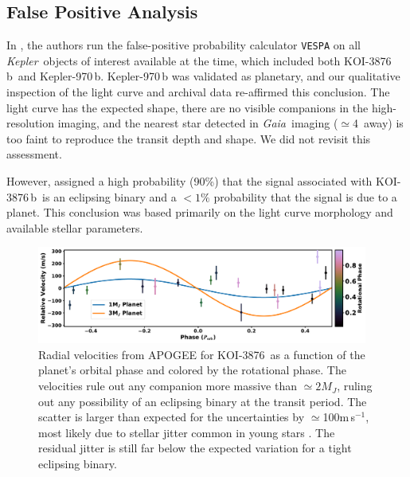 \documentclass[twocolumn, linenumbers]{aastex631}
\newcommand{\starname}{KOI-3876}
\newcommand{\planetname}{KOI-3876\,b}
\newcommand{\planetnametwo}{Kepler-970\,b}
\newcommand{\mps}{m\,s$^{-1}$}
\newcommand{\kepler}{{\it Kepler}}
\newcommand{\gaia}{\textit{Gaia}}
\begin{document}
\subsection{False Positive Analysis}\label{sec:fpp}
In \citet{2016ApJ...822...86M}, the authors run the false-positive probability calculator \texttt{VESPA} \citep{2015ascl.soft03011M} on all \kepler\ objects of interest available at the time, which included both \planetname\ and \planetnametwo. Kepler-970\,b was validated as planetary, and our qualitative inspection of the light curve and archival data re-affirmed this conclusion. The light curve has the expected shape, there are no visible companions in the high-resolution imaging, and the nearest star detected in \gaia\ imaging ($\simeq$4\arcsec\ away) is too faint to reproduce the transit depth and shape. We did not revisit this assessment. 

 However, \citet{2016ApJ...822...86M} assigned a high probability (90\%) that the signal associated with \planetname\ is an eclipsing binary and a $<1\%$ probability that the signal is due to a planet. This conclusion was based primarily on the light curve morphology and available stellar parameters. 

\begin{figure}[tb]
    \centering
    \includegraphics[width=0.97\textwidth]{APOGEE_RVs.pdf}
    \caption{Radial velocities from APOGEE \citep{2020AJ....160..120J} for \starname\ as a function of the planet's orbital phase and colored by the rotational phase. The velocities rule out any companion more massive than $\simeq2M_J$, ruling out any possibility of an eclipsing binary at the transit period. The scatter is larger than expected for the uncertainties by $\simeq$100\mps, most likely due to stellar jitter common in young stars \citep{2019A&A...632A..37B, 2021AJ....161..173T}. The residual jitter is still far below the expected variation for a tight eclipsing binary. }
    \label{fig:RVs}
\end{figure} 
\end{document}
